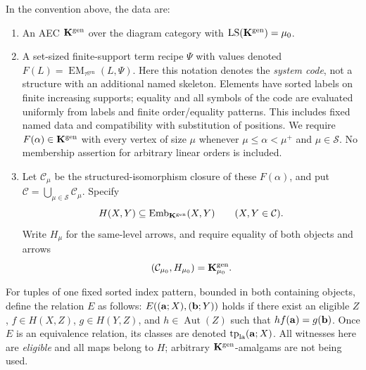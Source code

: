 \begin{definition}
\label{def:working-scheme-data}
In the convention above, the data are:
\begin{enumerate}[label=\textup{(D\arabic*)},leftmargin=*]
\item An AEC $\mathbf K^{\mathrm{gen}}$ over the diagram category with
$\operatorname{LS}(\mathbf K^{\mathrm{gen}})=\mu_0$.
\item A set-sized finite-support term recipe $\Psi$ with values denoted
$F(L)=\operatorname{EM}_{\tau^{\mathrm{gen}}}(L,\Psi)$.
Here this notation denotes the \emph{system code}, not a structure
with an additional named skeleton. Elements have sorted labels on finite
increasing supports; equality and all symbols of the code are evaluated
uniformly from labels and finite order/equality patterns. This includes
fixed named data and compatibility with substitution of positions.
We require $F(\alpha)\in\mathbf K^{\mathrm{gen}}$ with every vertex of size
$\mu$ whenever $\mu\leq\alpha<\mu^+$ and $\mu\in\mathcal S$.
No membership assertion for arbitrary linear orders is included.
\item Let $\mathcal C_\mu$ be the structured-isomorphism closure of
these $F(\alpha)$, and put $\mathcal C=\bigcup_{\mu\in\mathcal S}\mathcal C_\mu$.
Specify
\[
 H(X,Y)\subseteq\operatorname{Emb}_{\mathbf K^{\mathrm{gen}}}(X,Y)
 \qquad(X,Y\in\mathcal C).
\]
Write $H_\mu$ for the same-level arrows, and require equality of both
objects and arrows
\[
 (\mathcal C_{\mu_0},H_{\mu_0})=\mathbf K^{\mathrm{gen}}_{\mu_0}.
\]
\end{enumerate}
For tuples of one fixed sorted index pattern, bounded in both containing
objects, define the relation $E$ as follows: $E((\mathbf{a};X),(\mathbf{b};Y))$ holds
if there exist an eligible $Z$, $f\in H(X,Z)$, $g\in H(Y,Z)$, and
$h\in\operatorname{Aut}(Z)$ such that $hf(\mathbf{a})=g(\mathbf{b})$.
Once $E$ is an equivalence relation, its classes are denoted
$\operatorname{tp}_{\mathrm{la}}(\mathbf{a};X)$.
All witnesses here are \emph{eligible} and all maps belong to $H$;
arbitrary $\mathbf K^{\mathrm{gen}}$-amalgams are not being used.
\end{definition}

